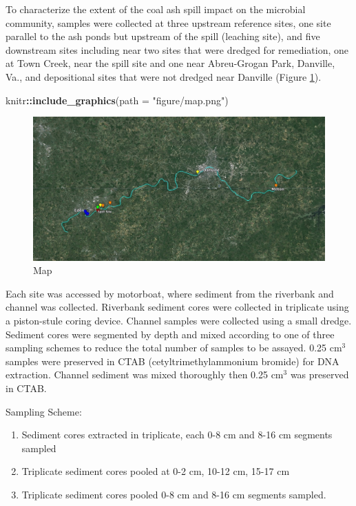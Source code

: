 \documentclass[ms]{uncgdissertationexp}
\newenvironment{Shaded}{\begin{snugshade}}{\end{snugshade}}
\newcommand{\KeywordTok}[1]{\textcolor[rgb]{0.13,0.29,0.53}{\textbf{#1}}}
\newcommand{\DataTypeTok}[1]{\textcolor[rgb]{0.13,0.29,0.53}{#1}}
\newcommand{\StringTok}[1]{\textcolor[rgb]{0.31,0.60,0.02}{#1}}
\newcommand{\OperatorTok}[1]{\textcolor[rgb]{0.81,0.36,0.00}{\textbf{#1}}}
\newcommand{\NormalTok}[1]{#1}
\theoremstyle{plain}
\theoremstyle{definition}
\theoremstyle{remark}
\begin{document}
  To characterize the extent of the coal ash spill impact on the microbial
  community, samples were collected at three upstream reference sites, one
  site parallel to the ash ponds but upstream of the spill (leaching
  site), and five downstream sites including near two sites that were
  dredged for remediation, one at Town Creek, near the spill site and one
  near Abreu-Grogan Park, Danville, Va., and depositional sites that were
  not dredged near Danville (Figure \ref{fig:map}).
  \begin{Shaded}
  \begin{Highlighting}[]
  \NormalTok{knitr}\OperatorTok{::}\KeywordTok{include_graphics}\NormalTok{(}\DataTypeTok{path =} \StringTok{"figure/map.png"}\NormalTok{)}
  \end{Highlighting}
  \end{Shaded}
  \begin{figure}
  
  {\centering \includegraphics[width=400pt]{figure/map} 
  
  }
  
  \caption{Map}\label{fig:map}
  \end{figure}
  Each site was accessed by motorboat, where sediment from the riverbank
  and channel was collected. Riverbank sediment cores were collected in
  triplicate using a piston-stule coring device. Channel samples were
  collected using a small dredge. Sediment cores were segmented by depth
  and mixed according to one of three sampling schemes to reduce the total
  number of samples to be assayed. 0.25 \(\mathrm{cm^3}\) samples were
  preserved in CTAB (cetyltrimethylammonium bromide) for DNA extraction.
  Channel sediment was mixed thoroughly then 0.25 \(\mathrm{cm^3}\) was
  preserved in CTAB.
  
  Sampling Scheme:
  \begin{enumerate}
  \def\labelenumi{\Alph{enumi}.}
  \item
    Sediment cores extracted in triplicate, each 0-8 cm and 8-16 cm
    segments sampled
  \item
    Triplicate sediment cores pooled at 0-2 cm, 10-12 cm, 15-17 cm
  \item
    Triplicate sediment cores pooled 0-8 cm and 8-16 cm segments sampled.
  \end{enumerate}
\end{document}
